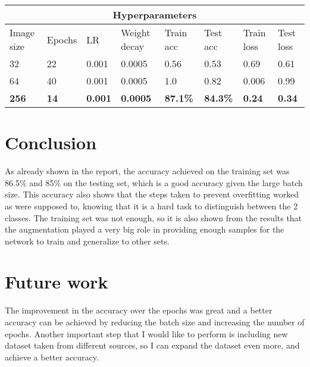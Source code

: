 \documentclass{article}
\begin{document}
\begin{adjustwidth}{-40pt}{-40pt}
\newpage

\FloatBarrier
\begin{table}[h!]
\hspace*{-1.45cm}
\begin{tabular}{ |p{1.4cm}|p{1.3cm}|p{1cm}|p{2.1cm}|p{1.4cm}|p{1.4cm}|p{1.5cm}|p{1.4cm}|}
 \hline
 \multicolumn{8}{|c|}{Hyperparameters} \\
 \hline
 Image size& Epochs& LR& Weight decay& Train acc& Test acc& Train loss& Test loss\\
 \hline
32 &22 &0.001 &0.0005 &0.56 &0.53 &0.69 &0.61 \\
64 &40 &0.001 &0.0005 &1.0 &0.82 &0.006 &0.99 \\
\textbf{256} &\textbf{14} &\textbf{0.001} &\textbf{0.0005} &\textbf{87.1\%} &\textbf{84.3\%} &\textbf{0.24} &\textbf{0.34} \\
 \hline
\end{tabular}
\caption{\label{table}}
\end{table}
\FloatBarrier

\section{Conclusion}

As already shown in the report, the accuracy achieved on the training set was 86.5\% and 85\% on the testing set, which is a good accuracy given the large batch size. This accuracy also shows that the steps taken to prevent overfitting worked as were supposed to, knowing that it is a hard task to distinguish between the 2 classes. The training set was not enough, so it is also shown from the results that the augmentation played a very big role in providing enough samples for the network to train and generalize to other sets.

\section{Future work}

The improvement in the accuracy over the epochs was great and a better accuracy can be achieved by reducing the batch size and increasing the number of epochs.
Another important step that I would like to perform is including new dataset taken from different sources, so I can expand the dataset even more, and achieve a better accuracy.



\printbibliography

\clearpage



\end{adjustwidth}
\end{document}
